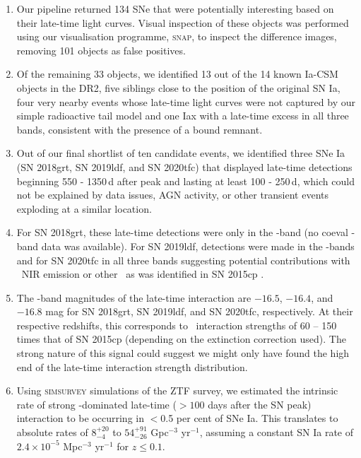\documentclass[a4paper,oneside,12pt, class=Latex/Classes/PhDthesisPSnPDF, crop=false]{standalone}
\begin{document}
\begin{enumerate}
 \item Our pipeline returned 134 SNe that were potentially interesting based on their late-time light curves. Visual inspection of these objects was performed using our visualisation programme, \textsc{snap}, to inspect the difference images, removing 101 objects as false positives. 
 \item Of the remaining 33 objects, we identified 13 out of the 14 known Ia-CSM objects in the DR2, five siblings close to the position of the original SN Ia, four very nearby events whose late-time light curves were not captured by our simple radioactive tail model and one Iax with a late-time excess in all three bands, consistent with the presence of a bound remnant. 
 \item Out of our final shortlist of ten candidate events, we identified three SNe Ia (SN 2018grt, SN 2019ldf, and SN 2020tfc) that displayed late-time detections beginning 550 - 1350\,d after peak and lasting at least 100 - 250\,d, which could not be explained by data issues, AGN activity, or other transient events exploding at a similar location. 
 \item For SN 2018grt, these late-time detections were only in the \ztfr-band (no coeval \ztfi-band data was available). For SN 2019ldf, detections were made in the \ztfr\ztfi-bands and for SN 2020tfc in all three bands suggesting potential contributions with \CaII\ NIR emission or other \MgI\ as was identified in SN 2015cp \citep{2015cp}. 
 \item The \ztfr-band magnitudes of the late-time interaction are $-16.5$, $-16.4$, and $-16.8$ mag for SN 2018grt, SN 2019ldf, and SN 2020tfc, respectively. At their respective redshifts, this corresponds to \Halpha~interaction strengths of 60 -- 150 times that of SN 2015cp (depending on the extinction correction used). The strong nature of this signal could suggest we might only have found the high end of the late-time interaction strength distribution.
 \item Using \textsc{simsurvey} simulations of the ZTF survey, we estimated the intrinsic rate of strong \Halpha-dominated late-time ($>100$ days after the SN peak) interaction to be occurring in $<$0.5 per cent of SNe Ia. This translates to absolute rates of $8_{-4}^{+20}$ to $54_{-26}^{+91}$ Gpc$^{-3}$ yr$^{-1}$, assuming a constant SN Ia rate of $2.4\times10^{-5}$ Mpc$^{-3}$ yr$^{-1}$ for $z \leq 0.1$.
\end{enumerate}
\end{document}
